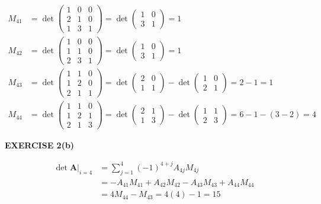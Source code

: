 \documentclass[12pt]{article}
\newcommand{\mat}[1]{\mathbf{#1}}
\newcommand{\exercise}[1]{\textbf{EXERCISE #1}\label{#1}}
\begin{document}
\begin{align*}
M_{41} &= \det \begin{pmatrix}
  1 & 0 & 0 \\
  2 & 1 & 0 \\
  1 & 3 & 1
\end{pmatrix}
= \det \begin{pmatrix}
  1 & 0 \\
  3 & 1
\end{pmatrix}
 = 1 \\
M_{42} &= \det \begin{pmatrix}
  1 & 0 & 0 \\
  1 & 1 & 0 \\
  2 & 3 & 1
\end{pmatrix}
 = \det \begin{pmatrix}
   1 & 0 \\
   3 & 1
\end{pmatrix}
= 1 \\
M_{43} &= \det \begin{pmatrix}
  1 & 1 & 0 \\
  1 & 2 & 0 \\
  2 & 1 & 1
\end{pmatrix}
= \det \begin{pmatrix}
  2 & 0 \\
  1 & 1
\end{pmatrix} -
\det \begin{pmatrix}
  1 & 0 \\
  2 & 1
\end{pmatrix}
= 2 - 1 = 1 \\
M_{44} &= \det \begin{pmatrix}
  1 & 1 & 0 \\
  1 & 2 & 1 \\
  2 & 1 & 3
\end{pmatrix}
= \det \begin{pmatrix}
  2 & 1 \\
  1 & 3
\end{pmatrix}
- \det \begin{pmatrix}
  1 & 1 \\
  2 & 3
\end{pmatrix}
= 6 - 1 - (3 - 2) = 4
\end{align*}

\exercise{2(b)}

\begin{align*}
\det \mat{A} \bigg\rvert_{i=4} &= \sum_{j=1}^{4} (-1)^{4 + j} A_{4j} M_{4j} \\
&= -A_{41} M_{41} + A_{42} M_{42} - A_{43} M_{43} + A_{44} M_{44} \\
&= 4M_{44} - M_{43} = 4(4) - 1 = 15 
\end{align*}
\end{document}
